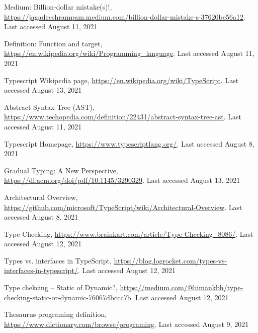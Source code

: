 \documentclass[english,runningheads, letterpaper]{llncs}[2018/03/10]
\begin{document}
\begin{thebibliography}{1}
 Medium: Billion-dollar mistake(s)!, \href{https://jagadeeshrampam.medium.com/billion-dollar-mistake-s-37620be56a12}{https://jagadeeshrampam.medium.com/billion-dollar-mistake-s-37620be56a12}. Last accessed August 11, 2021

 Definition: Function and target, \href{https://en.wikipedia.org/wiki/Programming\_language}{https://en.wikipedia.org/wiki/Programming\_language}. Last accessed August 11, 2021

 Typescript Wikipedia page, \href{https://en.wikipedia.org/wiki/TypeScript}{https://en.wikipedia.org/wiki/TypeScript}. Last accessed August 13, 2021

 Abstract Syntax Tree (AST), \href{https://www.techopedia.com/definition/22431/abstract-syntax-tree-ast}{https://www.techopedia.com/definition/22431/abstract-syntax-tree-ast}. Last accessed August 11, 2021

 Typescript Homepage, \href{https://www.typescriptlang.org/}{https://www.typescriptlang.org/}. Last accessed August 8, 2021

 Gradual Typing: A New Perspective, \href{https://dl.acm.org/doi/pdf/10.1145/3290329}{https://dl.acm.org/doi/pdf/10.1145/3290329}. Last accessed August 13, 2021

 Architectural Overview, \href{https://github.com/microsoft/TypeScript/wiki/Architectural-Overview}{https://github.com/microsoft/TypeScript/wiki/Architectural-Overview}. Last accessed August 8, 2021

 Type Checking, \href{https://www.brainkart.com/article/Type-Checking_8086/}{https://www.brainkart.com/article/Type-Checking\_8086/}. Last accessed August 12, 2021

 Types vs. interfaces in TypeScript, \href{https://blog.logrocket.com/types-vs-interfaces-in-typescript/}{https://blog.logrocket.com/types-vs-interfaces-in-typescript/}. Last accessed August 12, 2021

 Type chekcing -- Static of Dynamic?, \href{https://medium.com/@himankbh/type-checking-static-or-dynamic-76067dbccc7b}{https://medium.com/@himankbh/type-checking-static-or-dynamic-76067dbccc7b}. Last accessed August 12, 2021

 Thesaurus programing definition, \href{https://www.dictionary.com/browse/programing}{https://www.dictionary.com/browse/programing}. Last accessed August 9, 2021
\end{thebibliography}
\end{document}
